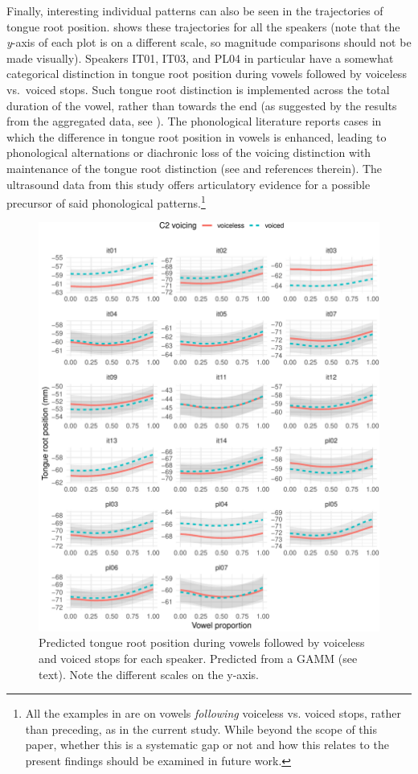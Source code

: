 \documentclass[12pt,]{article}
\let\rmarkdownfootnote\footnote%
\def\footnote{\protect\rmarkdownfootnote}
\begin{document}
Finally, interesting individual patterns can also be seen in the
trajectories of tongue root position.  shows
these trajectories for all the speakers (note that the \emph{y}-axis of
each plot is on a different scale, so magnitude comparisons should not
be made visually). Speakers IT01, IT03, and PL04 in particular have a
somewhat categorical distinction in tongue root position during vowels
followed by voiceless vs.~voiced stops. Such tongue root distinction is
implemented across the total duration of the vowel, rather than towards
the end (as suggested by the results from the aggregated data, see
). The phonological literature reports cases in which the
difference in tongue root position in vowels is enhanced, leading to
phonological alternations or diachronic loss of the voicing distinction
with maintenance of the tongue root distinction (see \citealt{vaux1996}
and references therein). The ultrasound data from this study offers
articulatory evidence for a possible precursor of said phonological
patterns.\footnote{All the examples in \citet{vaux1996} are on vowels \textit{following} voiceless vs. voiced stops, rather than preceding, as in the current study. While beyond the scope of this paper, whether this is a systematic gap or not and how this relates to the present findings should be examined in future work.}

\begin{figure}
\includegraphics[width=\linewidth]{2018-tra_files/figure-latex/tra-gam-s-ar-plot-1} \caption{Predicted tongue root position during vowels followed by voiceless and voiced stops for each speaker. Predicted from a GAMM (see text). Note the different scales on the y-axis.}\label{f:tra-gam-s-ar-plot}
\end{figure}
\end{document}
